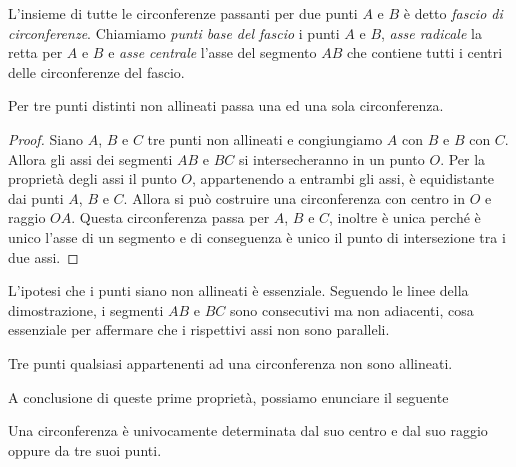 \begin{definizione}
L'insieme di tutte le circonferenze passanti per due punti \(A\) e \(B\) 
è detto \emph{fascio di circonferenze}. Chiamiamo \emph{punti base del fascio} i punti \(A\) e \(B\), \emph{asse 
radicale} la retta per \(A\) e \(B\) e \emph{asse centrale} l'asse del segmento \(AB\) che contiene 
tutti i centri delle circonferenze del fascio.
\end{definizione}

\begin{teorema}
Per tre punti distinti non allineati passa una ed una sola 
circonferenza.
\end{teorema}

\noindent\begin{minipage}{0.65\textwidth}\parindent15pt
\begin{proof}
Siano \(A\), \(B\) e \(C\) tre punti non allineati e congiungiamo \(A\) con 
\(B\) e \(B\) con \(C\). Allora gli assi dei segmenti \(AB\) e \(BC\) si 
intersecheranno in un punto \(O\). Per la proprietà degli assi il punto 
\(O\), appartenendo a entrambi gli assi, è equidistante dai punti \(A\), 
\(B\) e \(C\). Allora si può costruire una circonferenza con centro in 
\(O\) e raggio \(OA\). Questa circonferenza passa per \(A\), \(B\) e \(C\), 
inoltre è unica perché è unico l'asse di un segmento e di conseguenza 
è unico il punto di intersezione tra i due assi.
\end{proof}
\end{minipage}\hfil
\begin{minipage}{0.35\textwidth}
  \centering
\end{minipage}

\osservazione
L'ipotesi che i punti siano non allineati è essenziale. Seguendo le 
linee della dimostrazione, i segmenti \(AB\) e \(BC\) sono consecutivi ma 
non adiacenti, cosa essenziale per affermare che i rispettivi assi 
non sono paralleli. 

\begin{corollario}
Tre punti qualsiasi appartenenti ad una circonferenza non sono 
allineati.
\end{corollario}

A conclusione di queste prime proprietà, possiamo enunciare il 
seguente
\begin{corollario}
Una circonferenza è univocamente determinata dal suo centro e dal suo 
raggio oppure da tre suoi punti.
\end{corollario}

